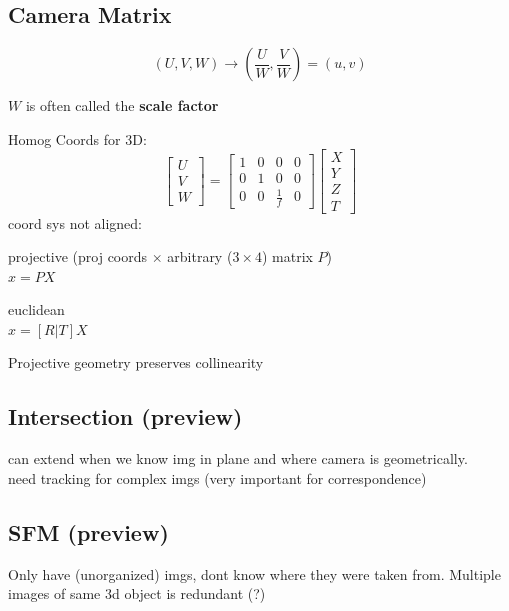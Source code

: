\documentclass{article}
\begin{document}
\subsection{Camera Matrix}
\[
    (U,V,W) \to \left ( \frac{U}{W}, \frac{V}{W}\right ) = (u,v)
\]
\begin{expln}
    {}{}
    $W$ is often called the \textbf{scale factor}
\end{expln}\noindent
Homog Coords for 3D:
\[
    \begin{bmatrix}
        U \\ V \\ W
    \end{bmatrix} = \begin{bmatrix}
        1 & 0 & 0 & 0\\
        0 & 1 & 0 & 0\\
        0 & 0 & \frac{1}{f} & 0
    \end{bmatrix}\begin{bmatrix}
        X\\Y\\Z\\T
    \end{bmatrix}
\]
coord sys not aligned:
\begin{list}{-}{}
    \item projective (proj coords $\times$ arbitrary ($3\times4$) matrix $P$)
        \\$x=PX$
    \item euclidean\\$x=[R|T]X$
\end{list}
\begin{expln}
    {}{}
    Projective geometry preserves collinearity
\end{expln}\noindent

\subsection{Intersection (preview)}
can extend when we know img in plane and where camera is geometrically.
\\
need tracking for complex imgs (very important for correspondence)

\subsection{SFM (preview)}
Only have (unorganized) imgs, dont know where they were taken from. Multiple
images of same 3d object is redundant (?)   
\end{document}
